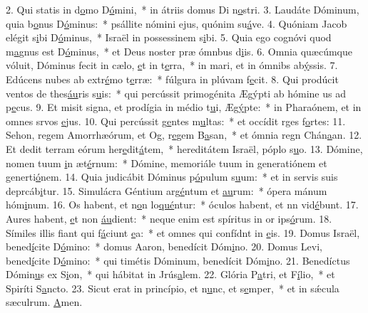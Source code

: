 2. Qui statis in d\uline{o}mo D\uline{ó}mini,~* in átriis domus Di n\uline{o}stri.
3. Laudáte Dóminum, quia b\uline{o}nus D\uline{ó}minus:~* psállite nómini ejus, quónim su\uline{á}ve.
4. Quóniam Jacob elégit s\uline{i}bi D\uline{ó}minus,~* Israël in possessinem s\uline{i}bi.
5. Quia ego cognóvi quod m\uline{a}gnus est D\uline{ó}minus,~* et Deus noster præ ómnbus d\uline{i}is.
6. Omnia quæcúmque vóluit, Dóminus fecit in cælo, \uline{e}t in t\uline{e}rra,~* in mari, et in ómnibs ab\uline{ý}ssis.
7. Edúcens nubes ab extr\uline{é}mo t\uline{e}rræ:~* fúlgura in plúvam f\uline{e}cit.
8. Qui prodúcit ventos de thes\uline{áu}ris s\uline{u}is:~* qui percússit primogénita Ægýpti ab hómine us ad p\uline{e}cus.
9. Et misit signa, et prodígia in médio t\uline{u}i, Æg\uline{ý}pte:~* in Pharaónem, et in omnes srvos \uline{e}jus.
10. Qui percússit g\uline{e}ntes m\uline{u}ltas:~* et occídit rges f\uline{o}rtes:
11. Sehon, regem Amorrhæórum, et Og, r\uline{e}gem B\uline{a}san,~* et ómnia regn Chán\uline{a}an.
12. Et dedit terram eórum her\uline{e}dit\uline{á}tem,~* hereditátem Israël, póplo s\uline{u}o.
13. Dómine, nomen tuum \uline{i}n æt\uline{é}rnum:~* Dómine, memoriále tuum in generatiónem et generti\uline{ó}nem.
14. Quia judicábit Dóminus p\uline{ó}pulum s\uline{u}um:~* et in servis suis deprcáb\uline{i}tur.
15. Simulácra Géntium arg\uline{é}ntum et \uline{au}rum:~* ópera mánum hóm\uline{i}num.
16. Os habent, et n\uline{o}n lo\uline{qué}ntur:~* óculos habent, et nn vid\uline{é}bunt.
17. Aures habent, \uline{e}t non \uline{áu}dient:~* neque enim est spíritus in or ips\uline{ó}rum.
18. Símiles illis fiant qui f\uline{á}ciunt \uline{e}a:~* et omnes qui confídnt in \uline{e}is.
19. Domus Israël, bened\uline{í}cite D\uline{ó}mino:~* domus Aaron, benedícit Dóm\uline{i}no.
20. Domus Levi, bened\uline{í}cite D\uline{ó}mino:~* qui timétis Dóminum, benedícit Dóm\uline{i}no.
21. Benedíctus Dómin\uline{u}s ex S\uline{i}on,~* qui hábitat in Jrús\uline{a}lem.
22. Glória P\uline{a}tri, et F\uline{í}lio,~* et Spiríti S\uline{a}ncto.
23. Sicut erat in princípio, et n\uline{u}nc, et s\uline{e}mper,~* et in sǽcula sæculrum. \uline{A}men.
